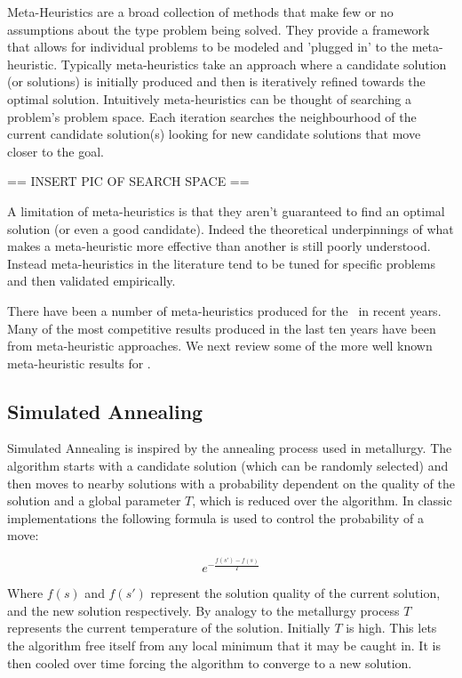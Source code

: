 Meta-Heuristics are a broad collection of methods that make few or no assumptions about the type problem being solved. They provide a framework that allows for individual problems to be modeled and 'plugged in' to the meta-heuristic. Typically meta-heuristics take an approach where a candidate solution (or solutions) is initially produced and then is iteratively refined towards the optimal solution. Intuitively meta-heuristics can be thought of searching a problem's problem space. Each iteration searches the neighbourhood of the current candidate solution(s) looking for new candidate solutions that move closer to the goal. 

== INSERT PIC OF SEARCH SPACE ==

A limitation of meta-heuristics is that they aren't guaranteed to find an optimal solution (or even a good candidate). Indeed the theoretical underpinnings of what makes a meta-heuristic more effective than another is still poorly understood. Instead meta-heuristics in the literature tend to be tuned for specific problems and then validated empirically.

There have been a number of meta-heuristics produced for the \VRP\ in recent years. Many of the most competitive results produced in the last ten years have been from meta-heuristic approaches. We next review some of the more well known meta-heuristic results for \VRP.

\subsection{Simulated Annealing}

Simulated Annealing is inspired by the annealing process used in metallurgy. The algorithm starts with a candidate solution (which can be randomly selected) and then moves to nearby solutions with a probability dependent on the quality of the solution and a global parameter $T$, which is reduced over the algorithm. In classic implementations the following formula is used to control the probability of a move: 

\[
e^{-\frac{f(s')-f(s)}{T}}
\]

Where $f(s)$ and $f(s')$ represent the solution quality of the current solution, and the new solution respectively. By analogy to the metallurgy process $T$ represents the current temperature of the solution. Initially $T$ is high. This lets the algorithm free itself from any local minimum that it may be caught in. It is then cooled over time forcing the algorithm to converge to a new solution. 


